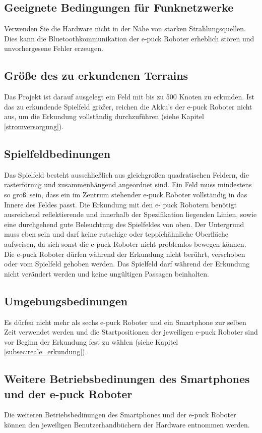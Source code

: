 \documentclass[10pt,a4paper]{article}
\begin{document}
		\subsection{Geeignete Bedingungen f\"ur Funknetzwerke} 
				Verwenden Sie die Hardware nicht in der N\"ahe von starken Strahlungsquellen. Dies kann die Bluetoothkommunikation der e-puck Roboter erheblich st\"oren 				und unvorhergesene Fehler erzeugen.
		\subsection{Gr\"o\ss e des zu erkundenen Terrains} 
				Das Projekt ist darauf ausgelegt ein Feld mit bis zu 500 Knoten zu erkunden. Ist das zu erkundende Spielfeld gr\"o\ss er, reichen die Akku's der e-puck 
				Roboter nicht aus, um die Erkundung vollst\"andig durchzuf\"uhren (siehe Kapitel \ref{stromversorgung}).
		\subsection{Spielfeldbedinungen} 
				Das Spielfeld besteht ausschlie\ss lich aus gleichgro\ss en quadratischen Feldern, die rasterf\"ormig und zusammenh\"angend angeordnet sind. Ein Feld 
				muss mindestens so gro\ss \ sein, dass ein im Zentrum stehender e-puck Roboter vollst\"andig in das Innere des Feldes passt. Die Erkundung mit den e-
				puck Robotern ben\"otigt ausreichend reflektierende und innerhalb der Spezifikation liegenden Linien, sowie eine durchgehend gute Beleuchtung des 
				Spielfeldes von oben. Der Untergrund muss eben sein und darf keine rutschige oder teppich\"ahnliche Oberfl\"ache aufweisen, da sich sonst die e-puck 
				Roboter nicht problemlos bewegen k\"onnen. Die e-puck Roboter d\"urfen w\"ahrend der Erkundung nicht ber\"uhrt, verschoben oder vom Spielfeld 
				gehoben werden. Das Spielfeld darf w\"ahrend der Erkundung nicht ver\"andert werden und keine ung\"ultigen Passagen beinhalten. 
		\subsection{Umgebungsbedinungen} 
				Es d\"urfen nicht mehr als sechs e-puck Roboter und ein Smartphone zur selben Zeit verwendet werden und die Startpositionen der jeweiligen e-puck 
				Roboter sind vor Beginn der Erkundung fest zu w\"ahlen (siehe Kapitel \ref{subsec:reale_erkundung}).
		\subsection{Weitere Betriebsbedinungen des Smartphones und der e-puck Roboter} 
				Die weiteren Betriebsbedinungen des Smartphones und der e-puck Roboter k\"onnen den jeweiligen Benutzerhandb\"uchern der Hardware entnommen 
				werden.
\end{document}
